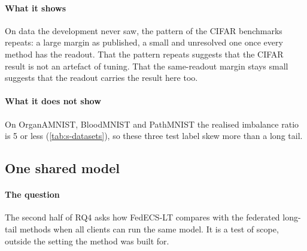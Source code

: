 \paragraph{What it shows} On data the development never saw, the pattern of the CIFAR benchmarks repeats: a large
margin as published, a small and unresolved one once every method has the readout. That the pattern repeats suggests
that the CIFAR result is not an artefact of tuning. That the same-readout margin stays small suggests that the readout
carries the result here too.

\paragraph{What it does not show} On OrganAMNIST, BloodMNIST and PathMNIST the realised imbalance ratio is 5 or less
(\cref{tab:s-datasets}), so these three test label skew more than a long tail.

\subsection{One shared model}\label{sec:s-shared}

\paragraph{The question} The second half of RQ4 asks how FedECS-LT compares with the federated long-tail methods when
all clients can run the same model. It is a test of scope, outside the setting the method was built for.

\begin{table}[t]
\centering\small
\caption{Balanced accuracy (\%) with one ResNet-8 shared by all clients (FedLTLib protocol), imbalance ratio 100; the
paper's shared-model table. Each row averages the seeds that completed: on CIFAR-10-LT seeds 3 and 4 for FedECS-LT,
CCVR, Fed-GraB, FedLC, FedYoYo and RUCR, seeds 3--5 for the others; on CIFAR-100-LT seeds 3 and 4, but seed 4 only
for FedECS-LT and FedLoGe, whose values have no $\pm$. Look at
which rows are clearly above the first one, and which only slightly.}
\label{tab:s-shared}
\end{table}

